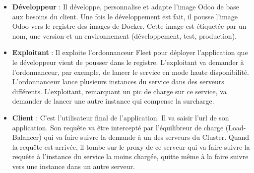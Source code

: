 \begin{onehalfspace}
\begin{itemize}
 	\item \textbf{Développeur} : Il développe, personnalise et adapte l'image Odoo de base aux besoins du client. Une fois le développement est fait, il pousse l'image Odoo vers le registre des images de Docker. Cette image est étiquetée par un nom, une version et un environnement (développement, test, production).
 	\item \textbf{Exploitant} : Il exploite l'ordonnanceur Fleet pour déployer l'application que le développeur vient de pousser dans le registre. L'exploitant va demander à l'ordonnanceur, par exemple, de lancer le service en mode haute disponibilité. L'ordonnanceur lance plusieurs instances du service dans des serveurs différents. L'exploitant, remarquant un pic de charge sur ce service, va demander de lancer une autre instance qui compense la surcharge.
 	\item \textbf{Client} : C'est l'utilisateur final de l'application. Il va saisir l'\acrshort{url} de son application. Son requête va être intercepté par l'équilibreur de charge (Load-Balancer) qui va faire suivre la demande à un des serveurs du Cluster. Quand la requête est arrivée, il tombe sur le proxy de ce serveur qui va faire suivre la requête à l'instance du service la moins chargée, quitte même à la faire suivre vers une instance dans un autre serveur.
 \end{itemize} 




\end{onehalfspace}
